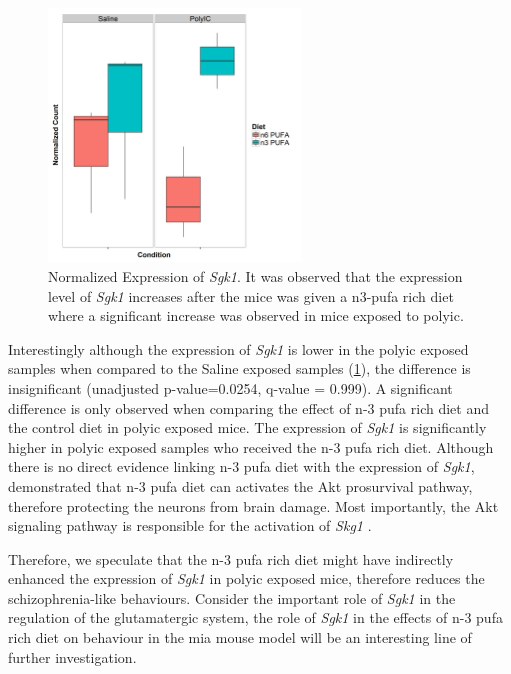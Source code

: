 \documentclass[12pt]{scrbook}
\newcommand*{\scz}{schizophrenia}
\begin{document}
\begin{figure}
	\centering
	\includegraphics[width=0.6\textwidth]{figure/omega/Sgk1_expression.png}
	\caption[Normalized Expression of \textit{Sgk1}]{
		Normalized Expression of \textit{Sgk1}.
		It was observed that the expression level of \textit{Sgk1} increases after the mice was given a n3-\gls{pufa} rich diet where a significant increase was observed in mice exposed to \gls{polyic}.
	}\label{fig:sgk1Express}
\end{figure}

Interestingly although the expression of \textit{Sgk1} is lower in the \gls{polyic} exposed samples when compared to the Saline exposed samples (\cref{fig:sgk1Express}), the difference is insignificant (unadjusted p-value=0.0254, q-value = 0.999). 
A significant difference is only observed when comparing the effect of n-3 \gls{pufa} rich diet and the control diet in \gls{polyic} exposed mice.
The expression of \textit{Sgk1} is significantly higher in \gls{polyic} exposed samples who received the n-3 \gls{pufa} rich diet. 
Although there is no direct evidence linking n-3 \gls{pufa} diet with the expression of \textit{Sgk1}, \citet{Zhang2015} demonstrated that n-3 \gls{pufa} diet can activates the Akt prosurvival pathway, therefore protecting the neurons from brain damage.
Most importantly, the Akt signaling pathway is responsible for the activation of \textit{Skg1} \citep{Lang2010}.

Therefore, we speculate that the n-3 \gls{pufa} rich diet might have indirectly enhanced the expression of \textit{Sgk1} in \gls{polyic} exposed mice, therefore reduces the \scz-like behaviours.
Consider the important role of \textit{Sgk1} in the regulation of the glutamatergic system, the role of \textit{Sgk1} in the effects of n-3 \gls{pufa} rich diet on behaviour in the \gls{mia} mouse model will be an interesting line of further investigation.
\end{document}
